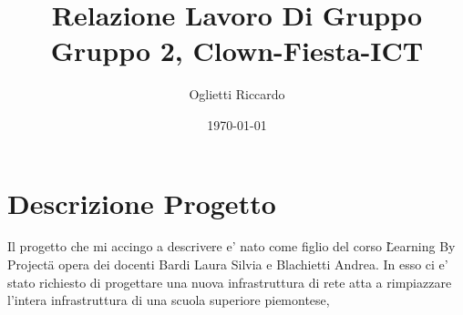 \documentclass{report}
\author{Oglietti Riccardo}
\title{Relazione Lavoro Di Gruppo\\
\large Gruppo 2, Clown-Fiesta-ICT}
\date{\today}
\begin{document}
    \maketitle
    \chapter{Descrizione Progetto}
    Il progetto che mi accingo a descrivere e' nato come figlio del corso \"Learning By Project\" a opera dei docenti\nolinebreak
     Bardi Laura Silvia e Blachietti Andrea. In esso ci e' stato richiesto di progettare una nuova infrastruttura di\nolinebreak
     rete atta a rimpiazzare l'intera infrastruttura di una scuola superiore piemontese,
\end{document}

